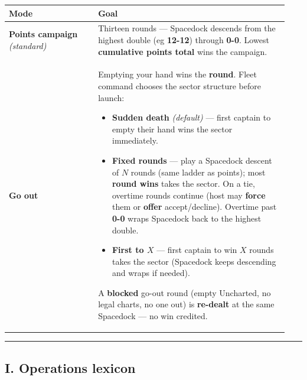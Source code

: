 \documentclass[11pt]{article}
\providecommand{\tightlist}{%
  \setlength{\itemsep}{0pt}\setlength{\parskip}{0pt}}
\begin{document}
\begin{longtable}[]{@{}>{\raggedright\arraybackslash}p{0.30\linewidth}>{\raggedright\arraybackslash}p{0.64\linewidth}@{}}
\toprule\noalign{}
Mode & Goal \\
\midrule\noalign{}
\endhead
\bottomrule\noalign{}
\endlastfoot
\textbf{Points campaign} \emph{(standard)} & Thirteen rounds ---
Spacedock descends from the highest double (eg \textbf{12-12}) through
\textbf{0-0}. Lowest \textbf{cumulative points total} wins the
campaign. \\
\textbf{Go out} & Emptying your hand wins the \textbf{round}. Fleet
command chooses the sector structure before launch:
\begin{itemize}
\tightlist
\item \textbf{Sudden death} \emph{(default)} --- first captain to empty
their hand wins the sector immediately.
\item \textbf{Fixed rounds} --- play a Spacedock descent of $N$ rounds
(same ladder as points); most \textbf{round wins} takes the sector. On a
tie, overtime rounds continue (host may \textbf{force} them or
\textbf{offer} accept/decline). Overtime past \textbf{0-0} wraps Spacedock
back to the highest double.
\item \textbf{First to $X$} --- first captain to win $X$ rounds takes
the sector (Spacedock keeps descending and wraps if needed).
\end{itemize}
A \textbf{blocked} go-out round (empty Uncharted, no legal charts, no
one out) is \textbf{re-dealt} at the same Spacedock --- no win credited.
\\
\end{longtable}

\begin{center}\rule{0.5\linewidth}{0.5pt}\end{center}

\subsection{I. Operations lexicon}\label{i-operations-lexicon}
\end{document}
